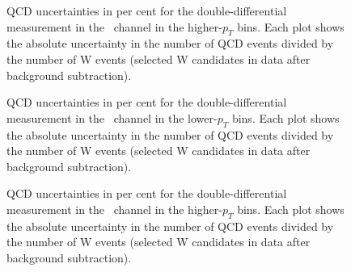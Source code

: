 \begin{figure}[phtb]
  \begin{center}
 \caption{QCD uncertainties in per cent for the double-differential measurement in the \Wmunup\ channel in the higher-$p_{T}$ bins. Each plot shows the absolute uncertainty in the number of QCD events divided by the number of W events (selected W candidates in data after background subtraction).}
 \label{fig:Wmunu:qcd_unc_vsEta_vsPt_pos_p2}
 \end{center}
\end{figure}

\begin{figure}[phtb]
  \begin{center}
 \caption{QCD uncertainties in per cent for the double-differential measurement in the \Wmunum\ channel in the lower-$p_T$ bins. Each plot shows the absolute uncertainty in the number of QCD events divided by the number of W events (selected W candidates in data after background subtraction).}
 \label{fig:Wmunu:qcd_unc_vsEta_vsPt_neg_p1}
 \end{center}
\end{figure}

\begin{figure}[phtb]
  \begin{center}
 \caption{QCD uncertainties in per cent for the double-differential measurement in the \Wmunum\ channel in the higher-$p_{T}$ bins. Each plot shows the absolute uncertainty in the number of QCD events divided by the number of W events (selected W candidates in data after background subtraction).}
 \label{fig:Wmunu:qcd_unc_vsEta_vsPt_neg_p2}
 \end{center}
\end{figure}


